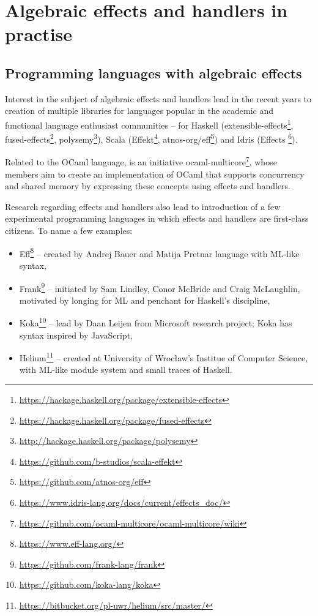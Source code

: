 
\newcommand{\inl}[1]{\lstinline[style=Haleff-inl]{#1}}

\chapter{Algebraic effects and handlers in practise}

\section{Programming languages with algebraic effects}

Interest in the subject of algebraic effects and handlers lead in the recent years to creation of multiple libraries for languages popular in the academic and functional language enthusiast communities -- for Haskell (extensible-effects\footnote{\url{https://hackage.haskell.org/package/extensible-effects}},
fused-effects\footnote{\url{https://hackage.haskell.org/package/fused-effects}},
polysemy\footnote{\url{http://hackage.haskell.org/package/polysemy}}), Scala
(Effekt\footnote{\url{https://github.com/b-studios/scala-effekt}},
atnos-org/eff\footnote{\url{https://github.com/atnos-org/eff}})
and Idris (Effects \footnote{\url{https://www.idris-lang.org/docs/current/effects_doc/}}).

Related to the OCaml language, is an initiative ocaml-multicore\footnote{\url{https://github.com/ocaml-multicore/ocaml-multicore/wiki}}, whose members aim to create an implementation of OCaml that supports concurrency and shared memory by expressing these concepts using effects and handlers.

Research regarding effects and handlers also lead to introduction of a few experimental programming languages in which effects and handlers are first-class citizens. To name a few examples:
\begin{itemize}
\item Eff\footnote{\url{https://www.eff-lang.org/}} -- created by Andrej Bauer and Matija Pretnar language with ML-like syntax,
\item Frank\footnote{\url{https://github.com/frank-lang/frank}} \cite{DBLP:journals/corr/LindleyMM16} -- initiated by Sam Lindley, Conor McBride and Craig McLaughlin, motivated by longing for ML and penchant for Haskell's discipline,
\item Koka\footnote{\url{https://github.com/koka-lang/koka}} -- lead by Daan Leijen from Microsoft research project; Koka has syntax inspired by JavaScript,
\item Helium\footnote{\url{https://bitbucket.org/pl-uwr/helium/src/master/}} \cite{biernacki2019abstracting} -- created at University of Wroc\l{}aw's Institue of Computer Science, with ML-like module system and small traces of Haskell.
\end{itemize}


